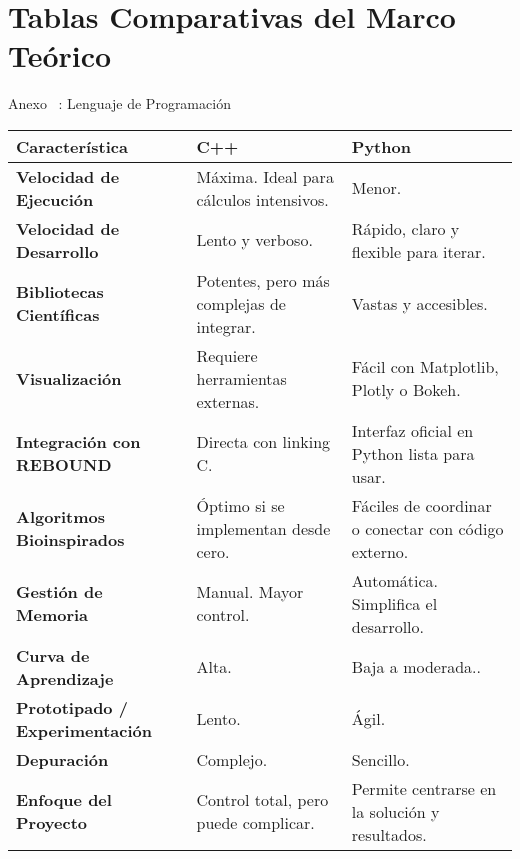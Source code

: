 \section[Comparativas]{Tablas Comparativas del Marco Teórico}

\begin{frame}{Anexo \thesection~: Lenguaje de Programación}
    \centering
    \label{tab:comparativa}
    \vspace{-0.1cm}
    \begin{adjustbox}{max width=0.9\textwidth,max height=0.7\textheight, keepaspectratio}
        \renewcommand{\arraystretch}{1.3}
            \begin{tabular}{@{}>{\bfseries}p{} p{} >{\columncolor{yellow!30}}p{}@{}}
            \toprule
            \textbf{Característica} & \textbf{C++} & \textbf{Python} \\
            \midrule
            Velocidad de Ejecución & Máxima. Ideal para cálculos intensivos. & Menor. \\
            Velocidad de Desarrollo & Lento y verboso. & Rápido, claro y flexible para iterar. \\
            Bibliotecas Científicas & Potentes, pero más complejas de integrar. & Vastas y accesibles. \\
            Visualización & Requiere herramientas externas. & Fácil con Matplotlib, Plotly o Bokeh. \\
            Integración con REBOUND & Directa con linking C. & Interfaz oficial en Python lista para usar. \\
            Algoritmos Bioinspirados & Óptimo si se implementan desde cero. & Fáciles de coordinar o conectar con código externo. \\
            Gestión de Memoria & Manual. Mayor control. & Automática. Simplifica el desarrollo. \\
            Curva de Aprendizaje & Alta. & Baja a moderada.. \\
            Prototipado / Experimentación & Lento. & Ágil. \\
            Depuración & Complejo. & Sencillo. \\
            Enfoque del Proyecto & Control total, pero puede complicar. & Permite centrarse en la solución y resultados. \\
            \bottomrule
            \end{tabular}
    \end{adjustbox}
    \smallskip
\end{frame}


